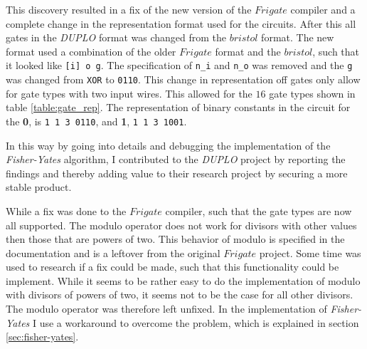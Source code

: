 \documentclass[twoside,11pt,openright]{report}
\newcommand{\FY}{\textit{Fisher-Yates} }
\newcommand{\DUPLO}{\textit{DUPLO} }
\begin{document}
\bigskip

\begin{table}[t]
\centering
{}
\caption{A table of the 16 different gate types, that can be used in a circuit of the type used in \DUPLO}
\label{table:gate_rep}
\end{table}


This discovery resulted in a fix of the new version of the $Frigate$ compiler and a complete change in the representation format used for the circuits. After this all gates in the \DUPLO format was changed from the $bristol$ format. The new format used a combination of the older $Frigate$ format and the $bristol$, such that it looked like \verb|[i] o g|. The specification of \verb|n_i| and \verb|n_o| was removed and the \verb|g| was changed from \verb|XOR| to \verb|0110|. This change in representation off gates only allow for gate types with two input wires. This allowed for the $16$ gate types shown in table \ref{table:gate_rep}. The representation of binary constants in the circuit for the \textbf{0}, is \verb|1 1 3 0110|, and \textbf{1}, \verb|1 1 3 1001|.

In this way by going into details and debugging the implementation of the \FY algorithm, I contributed to the \DUPLO project by reporting the findings and thereby adding value to their research project by securing a more stable product.

While a fix was done to the $Frigate$ compiler, such that the gate types are now all supported. The modulo operator does not work for divisors with other values then those that are powers of two. This behavior of modulo is specified in the documentation and is a leftover from the original $Frigate$ project. Some time was used to research if a fix could be made, such that this functionality could be implement. While it seems to be rather easy to do the implementation of modulo with divisors of powers of two, it seems not to be the case for all other divisors. The modulo operator was therefore left unfixed. In the implementation of \FY I use a workaround to overcome the problem, which is explained in section \ref{sec:fisher-yates}.
\end{document}
